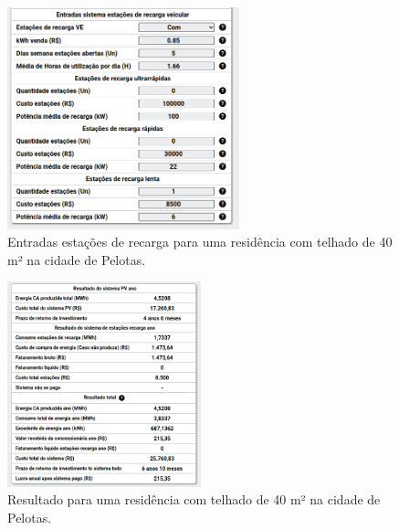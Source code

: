 \documentclass{beamer}
\begin{document}
\begin{frame}


\begin{figure}[H]
    \centering
    \includegraphics[width=0.6\textwidth]{./Figuras/casa_minha_2_2.png}
    \caption{Entradas estações de recarga para uma residência com telhado de 40 m² na cidade de Pelotas.}
   \label{fig:casa_minha_2_2}
\end{figure}

\end{frame}
\begin{frame}


\begin{figure}[H]
    \centering
    \includegraphics[width=0.5\textwidth]{./Figuras/casa_minha_2_3.png}
    \caption{Resultado para uma residência com telhado de 40 m² na cidade de Pelotas.}
   \label{fig:casa_minha_2_3}
\end{figure}

\end{frame}
\end{document}
